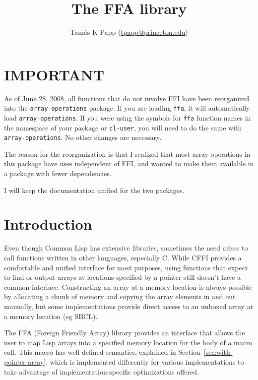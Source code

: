 \documentclass[12pt,a4paper,dvipdfm]{article}
\begin{document}
\title{The FFA library}
\author{Tam\'as K Papp (\url{tpapp@princeton.edu})}
\maketitle

\section{IMPORTANT}
\label{sec:important}

As of June 28, 2008, all functions that do not involve FFI have been
reorganized into the \verb!array-operations! package.  If you are
loading \verb!ffa!, it will automatically load
\verb!array-operations!.  If you were using the symbols for \verb!ffa!
function names in the namespace of your package or \verb!cl-user!, you
will need to do the same with \verb!array-operations!.  No other
changes are necessary.

The reason for the reorganization is that I realized that most array
operations in this package have uses independent of FFI, and wanted to
make them available in a package with fewer dependencies.

I will keep the documentation unified for the two packages.

\section{Introduction}
\label{sec:motivation}

Even though Common Lisp has extensive libraries, sometimes the need
arises to call functions written in other languages, especially C.
While CFFI provides a comfortable and unified interface for most
purposes, using functions that expect to find or output arrays at
locations specified by a pointer still doesn't have a common
interface.  Constructing an array at a memory location is always
possible by allocating a chunk of memory and copying the array
elements in and out manually, but some implementations provide direct
access to an unboxed array at a memory location (eg SBCL).

The FFA (Foreign Friendly Array) library provides an interface that
allows the user to map Lisp arrays into a specified memory location
for the body of a macro call.  This macro has well-defined semantics,
explained in Section~\ref{sec:with-pointer-array}, which is
implemented differently for various implementations to take advantage
of implementation-specific optimizations offered.
\end{document}
